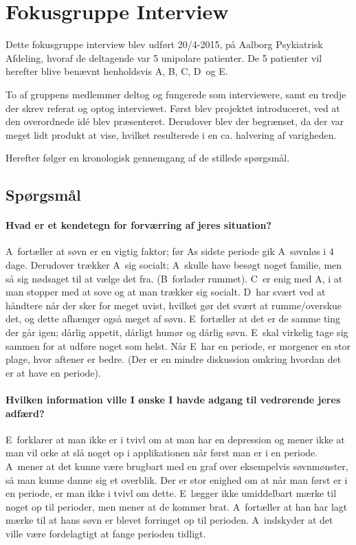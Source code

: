 \newcommand{\pa}{A}
\newcommand{\pb}{B}
\newcommand{\pc}{C}
\newcommand{\pd}{D}
\newcommand{\pe}{E}

\section{Fokusgruppe Interview}
Dette fokusgruppe interview blev udført 20/4-2015, på Aalborg Psykiatrisk Afdeling, hvoraf de deltagende var 5 unipolare patienter.
De 5 patienter vil herefter blive benævnt henholdsvis \pa, \pb, \pc, \pd~og \pe.

To af gruppens medlemmer deltog og fungerede som interviewere, samt en tredje der skrev referat og optog interviewet.
Først blev projektet introduceret, ved at den overordnede idé blev præsenteret.
Derudover blev der begrænset, da der var meget lidt produkt at vise, hvilket resulterede i en ca. halvering af varigheden.

Herefter følger en kronologisk gennemgang af de stillede spørgsmål.

\subsection{Spørgsmål}

\paragraph{Hvad er et kendetegn for forværring af jeres situation?}
\pa~fortæller at søvn er en vigtig faktor; før \pa s sidste periode gik \pa~søvnløs i 4 dage.
Derudover trækker \pa~sig socialt; \pa~skulle have besøgt noget familie, men så sig nødsaget til at vælge det fra.
(\pb~forlader rummet).
\pc~er enig med \pa, i at man stopper med at sove og at man trækker sig socialt.
\pd~har svært ved at håndtere når der sker for meget uvist, hvilket gør det svært at rumme/overskue det, og dette afhænger også meget af søvn.
\pe~fortæller at det er de samme ting der går igen; dårlig appetit, dårligt humør og dårlig søvn.
\pe~skal virkelig tage sig sammen for at udføre noget som helst.
Når \pe~har en periode, er morgener en stor plage, hvor aftener er bedre.
(Der er en mindre diskussion omkring hvordan det er at have en periode).

\paragraph{Hvilken information ville I ønske I havde adgang til vedrørende jeres adfærd?}
\pe~forklarer at man ikke er i tvivl om at man har en depression og mener ikke at man vil orke at slå noget op i applikationen når først man er i en periode.
\pa~mener at det kunne være brugbart med en graf over eksempelvis søvnmønster, så man kunne danne sig et overblik.
Der er stor enighed om at når man først er i en periode, er man ikke i tvivl om dette.
\pe~lægger ikke umiddelbart mærke til noget op til perioder, men mener at de kommer brat.
\pa~fortæller at han har lagt mærke til at hans søvn er blevet forringet op til perioden.
\pa~indskyder at det ville være fordelagtigt at fange perioden tidligt.

